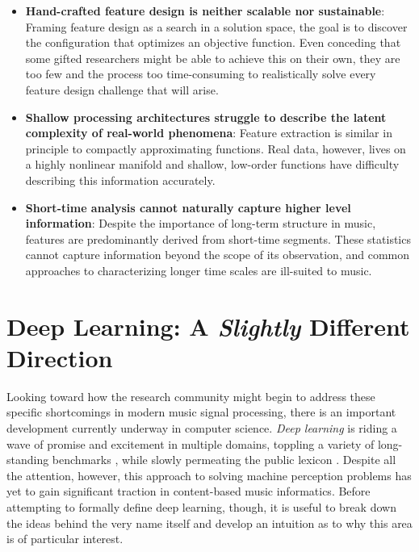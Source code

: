 \begin{itemize}

\item \textbf{Hand-crafted feature design is neither scalable nor sustainable}: Framing feature design as a search in a solution space, the goal is to discover the configuration that optimizes an objective function. Even conceding that some gifted researchers might be able to achieve this on their own, they are too few and the process too time-consuming to realistically solve every feature design challenge that will arise. \\
\item \textbf{Shallow processing architectures struggle to describe the latent complexity of real-world phenomena}: Feature extraction is similar in principle to compactly approximating functions. Real data, however, lives on a highly nonlinear manifold and shallow, low-order functions have difficulty describing this information accurately. \\
\item \textbf{Short-time analysis cannot naturally capture higher level information}: Despite the importance of long-term structure in music, features are predominantly derived from short-time segments. These statistics cannot capture information beyond the scope of its observation, and common approaches to characterizing longer time scales are ill-suited to music.\\

\end{itemize}

\section{Deep Learning: A \emph{Slightly} Different Direction}
\label{sec:deep_learning}

Looking toward how the research community might begin to address these specific shortcomings in modern music signal processing, there is an important development currently underway in computer science.
\emph{Deep learning} is riding a wave of promise and excitement in multiple domains, toppling a variety of long-standing benchmarks \cite{Krizhevsky2012Imagenet,Hinton2012Deep}, while slowly permeating the public lexicon \cite{Brumfiel2014Deep,Markoff2012Scientists}.
Despite all the attention, however, this approach to solving machine perception problems has yet to gain significant traction in content-based music informatics.
Before attempting to formally define deep learning, though, it is useful to break down the ideas behind the very name itself and develop an intuition as to why this area is of particular interest.


